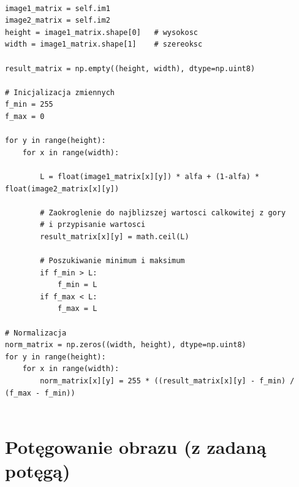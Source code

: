 \documentclass[final,a4paper,openany,12pt]{mwbk}
\begin{document}
\begin{lstlisting}[caption=Mieszanie obrazów szarych z określonym współczynnikiem]

image1_matrix = self.im1
image2_matrix = self.im2
height = image1_matrix.shape[0]   # wysokosc
width = image1_matrix.shape[1]    # szereoksc

result_matrix = np.empty((height, width), dtype=np.uint8)

# Inicjalizacja zmiennych
f_min = 255
f_max = 0

for y in range(height):
    for x in range(width):  

        L = float(image1_matrix[x][y]) * alfa + (1-alfa) * float(image2_matrix[x][y])

        # Zaokroglenie do najblizszej wartosci calkowitej z gory
        # i przypisanie wartosci
        result_matrix[x][y] = math.ceil(L)

        # Poszukiwanie minimum i maksimum
        if f_min > L:
            f_min = L
        if f_max < L:
            f_max = L

# Normalizacja
norm_matrix = np.zeros((width, height), dtype=np.uint8)
for y in range(height):
    for x in range(width):
        norm_matrix[x][y] = 255 * ((result_matrix[x][y] - f_min) / (f_max - f_min))
        
\end{lstlisting}



\section {Potęgowanie obrazu (z zadaną potęgą)}

\hfill
\\\\
\indent
\end{document}
